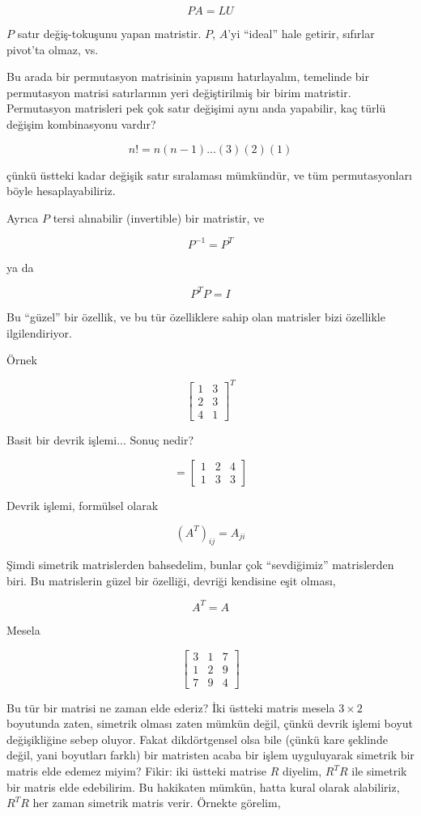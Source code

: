 \documentclass[12pt,fleqn]{article}\usepackage{../../common}
\begin{document}
$$ PA = LU $$

$P$ satır değiş-tokuşunu yapan matristir. $P$, $A$'yi ``ideal'' hale
getirir, sıfırlar pivot'ta olmaz, vs. 

Bu arada bir permutasyon matrisinin yapısını hatırlayalım, temelinde bir
permutasyon matrisi satırlarının yeri değiştirilmiş bir birim
matristir. Permutasyon matrisleri pek çok satır değişimi aynı anda
yapabilir, kaç türlü değişim kombinasyonu vardır? 

$$ n! = n(n-1)...(3)(2)(1) $$

çünkü üstteki kadar değişik satır sıralaması mümkündür, ve tüm
permutasyonları böyle hesaplayabiliriz. 

Ayrıca $P$ tersi alınabilir (invertible) bir matristir, ve 

$$ P^{-1} = P^T $$

ya da 

$$ P^TP = I $$

Bu ``güzel'' bir özellik, ve bu tür özelliklere sahip olan matrisler bizi
özellikle ilgilendiriyor.

Örnek

$$ 
\left[\begin{array}{rr}
1 & 3 \\
2 & 3 \\
4 & 1 
\end{array}\right]^T
 $$

Basit bir devrik işlemi... Sonuç nedir?

$$ =
\left[\begin{array}{rrr}
1 & 2 & 4 \\
1 & 3 & 3 
\end{array}\right]
 $$

Devrik işlemi, formülsel olarak 

$$ (A^T)_{ij} = A_{ji} $$

Şimdi simetrik matrislerden bahsedelim, bunlar çok ``sevdiğimiz''
matrislerden biri. Bu matrislerin güzel bir özelliği, devriği kendisine
eşit olması,

$$ A^T = A $$

Mesela

$$ 
\left[\begin{array}{rrr}
3 & 1 & 7 \\
1 & 2 & 9 \\
7 & 9 & 4
\end{array}\right]
$$

Bu tür bir matrisi ne zaman elde ederiz? İki üstteki matris mesela $3
\times 2$ boyutunda zaten, simetrik olması zaten mümkün değil, çünkü devrik
işlemi boyut değişikliğine sebep oluyor. Fakat dikdörtgensel olsa bile
(çünkü kare şeklinde değil, yani boyutları farklı) bir matristen acaba bir
işlem uyguluyarak simetrik bir matris elde edemez miyim? Fikir: iki üstteki
matrise $R$ diyelim, $R^TR$ ile simetrik bir matris elde edebilirim. Bu
hakikaten mümkün, hatta kural olarak alabiliriz, $R^TR$ her zaman simetrik
matris verir. Örnekte görelim, 
\end{document}

